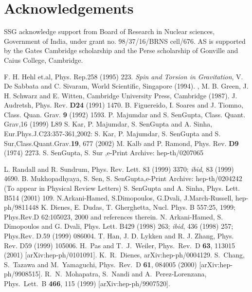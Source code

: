 \documentclass[a4paper,12pt]{article}
\begin{document}
\section*{Acknowledgements}{\small { SSG acknowledge support from Board of Research in Nuclear sciences,
Government of India, under grant no. 98/37/16/BRNS cell/676. AS is
supported by the Gates Cambridge scholarship and the Perse
scholarship of Gonville and Caius College, Cambridge. }}
\begin{thebibliography}{25}
F. H. Hehl et.al, Phys. Rep.258 (1995) 223.
 {\em Spin and Torsion in Gravitation}, V. De Sabbata and C. Sivaram,
World Scientific, Singapore (1994).
, M. B. Green, J. H. Schwarz and E. Witten,
Cambridge University Press, Cambridge (1987).
 J. Audretsh, Phys. Rev. {\bf D24} (1991) 1470.
 B. Figuereido, I. Soares and J. Tiomno, Class. Quan. Grav. {\bf 9}
                (1992) 1593.
P. Majumdar and S. SenGupta, Class. Quant. Grav,16
(1999) L89
 S. Kar, P. Majumdar, S. SenGupta and A. Sinha,
         Eur.Phys.J.C23:357-361,2002:
         S. Kar, P. Majumdar, S. SenGupta and S. Sur,Class.Quant.Grav.{\bf 19}, 677 (2002)
 M. Kalb and P. Ramond, Phys. Rev. {\bf D9} (1974) 2273.
S. SenGupta, S. Sur ,e-Print Archive: hep-th/0207065

L. Randall and R. Sundrum, Phys. Rev. Lett. 83 (1999) 3370;
{\it ibid}, 83 (1999) 4690.
B. Mukhopadhyaya, S. Sen, S. SenGupta,e-Print Archive: hep-th/0204242
                 (To appear in Physical Review Letters)
S. SenGupta and A. Sinha, Phys. Lett. B514 (2001) 109.
 N.Arkani-Hamed, S.Dimopoulos, G.Dvali, J.March-Russell, hep-ph/9811448
K. Dienes, E. Dudas, T. Gherghetta, Nucl. Phys. B 557:25, 1999;
Phys.Rev.D 62:105023, 2000 and references therein.
 N. Arkani-Hamed, S. Dimopoulos and G. Dvali,
Phys. Lett. B429 (1998) 263; {\it ibid},  436 (1998) 257;
Phys.Rev. D.59 (1999) 086004.
 T. Han, J. D. Lykken and R. J. Zhang, Phys. Rev. D59 (1999)
105006.
H.~Pas and T.~J.~Weiler,
Phys.\ Rev.\ D {\bf 63}, 113015 (2001) [arXiv:hep-ph/0101091].
K.~R.~Dienes,
arXiv:hep-ph/0004129.
S.~Chang, S.~Tazawa and M.~Yamaguchi,
Phys.\ Rev.\ D {\bf 61}, 084005 (2000) [arXiv:hep-ph/9908515].
R.~N.~Mohapatra, S.~Nandi and A.~Perez-Lorenzana,
Phys.\ Lett.\ B {\bf 466}, 115 (1999) [arXiv:hep-ph/9907520].

\end{thebibliography}
\end{document}

